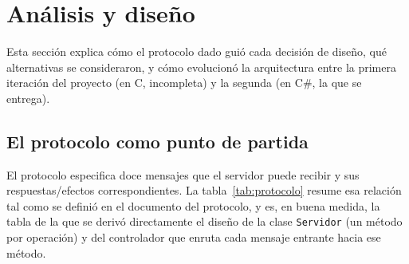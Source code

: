 \documentclass[11pt,letterpaper]{article}
\begin{document}
\section{Análisis y diseño}

Esta sección explica cómo el protocolo dado guió cada decisión de diseño,
qué alternativas se consideraron, y cómo evolucionó la arquitectura entre
la primera iteración del proyecto (en C, incompleta) y la segunda
(en C\#, la que se entrega).

\subsection{El protocolo como punto de partida}

El protocolo especifica doce mensajes que el servidor puede recibir y sus
respuestas/efectos correspondientes. La tabla~\ref{tab:protocolo} resume
esa relación tal como se definió en el documento del protocolo, y es, en
buena medida, la tabla de la que se derivó directamente el diseño de la
clase \texttt{Servidor} (un método por operación) y del controlador que
enruta cada mensaje entrante hacia ese método.
\end{document}
